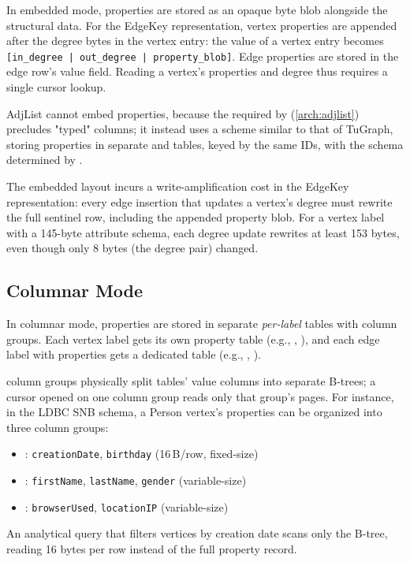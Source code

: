 In embedded mode, properties are stored as an opaque byte blob alongside the structural data.
For the EdgeKey representation, vertex properties are appended after the degree bytes in the vertex entry: the value of a vertex entry becomes \texttt{[in\_degree\,|\,out\_degree\,|\,property\_blob]}.
Edge properties are stored in the edge row's value field.
Reading a vertex's properties and degree thus requires a single cursor lookup.

AdjList cannot embed properties, because the  required by  (\autoref{arch:adjlist}) precludes "typed" columns; it instead uses a scheme similar to that of TuGraph, storing properties in separate  and  tables, keyed by the same IDs, with the schema determined by .

The embedded layout incurs a write-amplification cost in the EdgeKey representation: every edge insertion that updates a vertex's degree must rewrite the full sentinel row, including the appended property blob.
For a vertex label with a 145-byte attribute schema, each degree update rewrites at least 153 bytes, even though only 8 bytes (the degree pair) changed.

\subsection{Columnar Mode}
\label{arch:prop-columnar}

In columnar mode, properties are stored in separate \emph{per-label} tables with \wt{} column groups.
Each vertex label gets its own property table (e.g., , ), and each edge label with properties gets a dedicated table (e.g., , ).

\wt{} column groups physically split tables' value columns into separate B-trees; a cursor opened on one column group reads only that group's pages.
For instance, in the LDBC SNB schema, a Person vertex's properties can be organized into three column groups:
\begin{itemize}
  \item {}: \texttt{creationDate}, \texttt{birthday} (16\,B/row, fixed-size)
  \item {}: \texttt{firstName}, \texttt{lastName}, \texttt{gender} (variable-size)
  \item {}: \texttt{browserUsed}, \texttt{locationIP} (variable-size)
\end{itemize}
An analytical query that filters vertices by creation date scans only the  B-tree, reading 16 bytes per row instead of the full property record.

